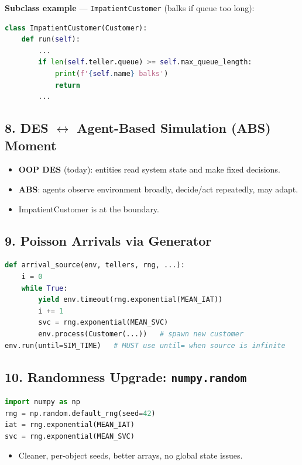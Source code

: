 \documentclass[11pt]{article}
\begin{document}
\textbf{Subclass example} --- \texttt{ImpatientCustomer} (balks if queue too long):
\begin{lstlisting}[language=Python]
class ImpatientCustomer(Customer):
    def run(self):
        ... 
        if len(self.teller.queue) >= self.max_queue_length:
            print(f'{self.name} balks')
            return
        ...
\end{lstlisting}

\subsection*{8. DES $\leftrightarrow$ Agent-Based Simulation (ABS) Moment}
\begin{itemize}[leftmargin=*]
\item \textbf{OOP DES} (today): entities read system state and make fixed decisions.
\item \textbf{ABS}: agents observe environment broadly, decide/act repeatedly, may adapt.
\item ImpatientCustomer is at the boundary.
\end{itemize}

\subsection*{9. Poisson Arrivals via Generator}
\begin{lstlisting}[language=Python]
def arrival_source(env, tellers, rng, ...):
    i = 0
    while True:
        yield env.timeout(rng.exponential(MEAN_IAT))
        i += 1
        svc = rng.exponential(MEAN_SVC)
        env.process(Customer(...))   # spawn new customer
env.run(until=SIM_TIME)   # MUST use until= when source is infinite
\end{lstlisting}

\subsection*{10. Randomness Upgrade: \texttt{numpy.random}}
\begin{lstlisting}[language=Python]
import numpy as np
rng = np.random.default_rng(seed=42)
iat = rng.exponential(MEAN_IAT)
svc = rng.exponential(MEAN_SVC)
\end{lstlisting}
\begin{itemize}[leftmargin=*]
\item Cleaner, per-object seeds, better arrays, no global state issues.
\end{itemize}
\end{document}
